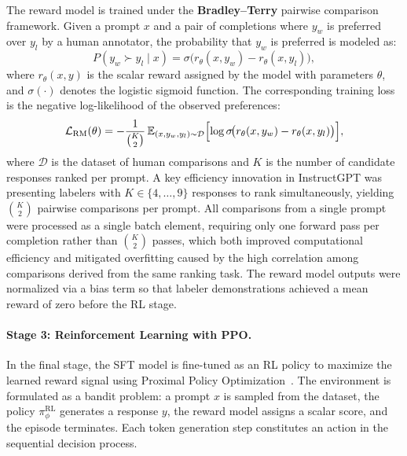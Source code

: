 The reward model is trained under the \textbf{Bradley--Terry} pairwise comparison framework. Given a prompt $x$ and a pair of completions where $y_w$ is preferred over $y_l$ by a human annotator, the probability that $y_w$ is preferred is modeled as:
\begin{equation}
    P(y_w \succ y_l \mid x) = \sigma\!\bigl(r_\theta(x, y_w) - r_\theta(x, y_l)\bigr),
\end{equation}
where $r_\theta(x, y)$ is the scalar reward assigned by the model with parameters $\theta$, and $\sigma(\cdot)$ denotes the logistic sigmoid function. The corresponding training loss is the negative log-likelihood of the observed preferences:
\begin{equation}
    \mathcal{L}_{\text{RM}}(\theta) = -\frac{1}{\binom{K}{2}} \, \mathbb{E}_{(x, y_w, y_l) \sim \mathcal{D}} \Bigl[\log \sigma\!\bigl(r_\theta(x, y_w) - r_\theta(x, y_l)\bigr)\Bigr],
    \label{eq:rm_loss}
\end{equation}
where $\mathcal{D}$ is the dataset of human comparisons and $K$ is the number of candidate responses ranked per prompt. A key efficiency innovation in InstructGPT was presenting labelers with $K \in \{4, \ldots, 9\}$ responses to rank simultaneously, yielding $\binom{K}{2}$ pairwise comparisons per prompt. All comparisons from a single prompt were processed as a single batch element, requiring only one forward pass per completion rather than $\binom{K}{2}$ passes, which both improved computational efficiency and mitigated overfitting caused by the high correlation among comparisons derived from the same ranking task. The reward model outputs were normalized via a bias term so that labeler demonstrations achieved a mean reward of zero before the RL stage.

\paragraph{Stage 3: Reinforcement Learning with PPO.}
In the final stage, the SFT model is fine-tuned as an RL policy to maximize the learned reward signal using Proximal Policy Optimization~\cite{schulman2017ppo}. The environment is formulated as a bandit problem: a prompt $x$ is sampled from the dataset, the policy $\pi_\phi^{\text{RL}}$ generates a response $y$, the reward model assigns a scalar score, and the episode terminates. Each token generation step constitutes an action in the sequential decision process.

